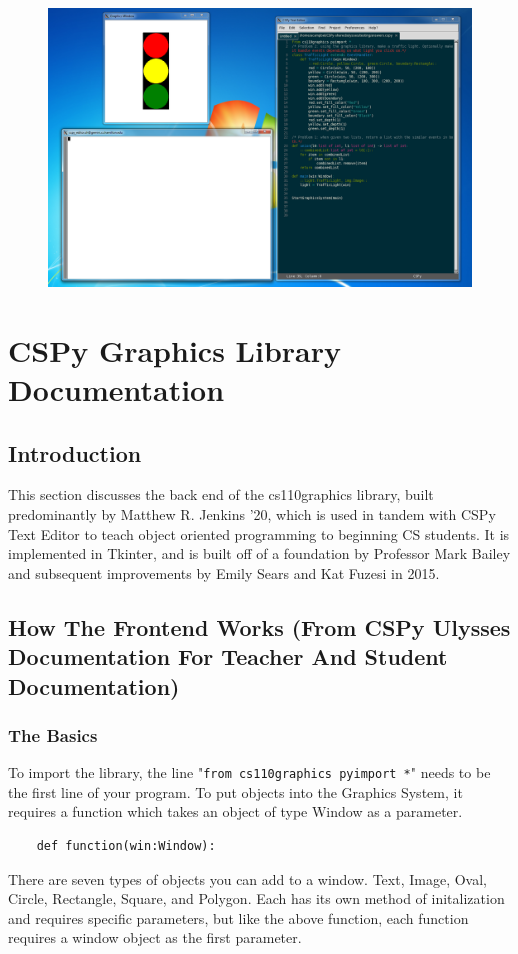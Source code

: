 \documentclass{article}
\begin{document}
\begin{figure}[H]
\centering
\includegraphics[width=\textwidth]{CSPyTextEditorSampleCodeWithGraphics}
\end{figure}

\pagebreak

\section{CSPy Graphics Library Documentation}
\subsection{Introduction}
This section discusses the back end of the cs110graphics library, built predominantly by Matthew R. Jenkins '20, which is used in tandem with CSPy Text Editor to teach object oriented programming to beginning CS students. It is implemented in Tkinter, and is built off of a foundation by Professor Mark Bailey and subsequent improvements by Emily Sears and Kat Fuzesi in 2015.

\subsection{How The Frontend Works (From CSPy Ulysses Documentation For Teacher And Student Documentation)}

\subsubsection{The Basics}
To import the library, the line "\verb|from cs110graphics pyimport *|" needs to be the first line of your program. To put objects into the Graphics System, it requires a function which takes an object of type Window as a parameter.
\begin{verbatim}
    def function(win:Window):
\end{verbatim}
There are seven types of objects you can add to a window. Text, Image, Oval, Circle, Rectangle, Square, and Polygon. Each has its own method of initalization and requires specific parameters, but like the above function, each function requires a window object as the first parameter.
\end{document}
